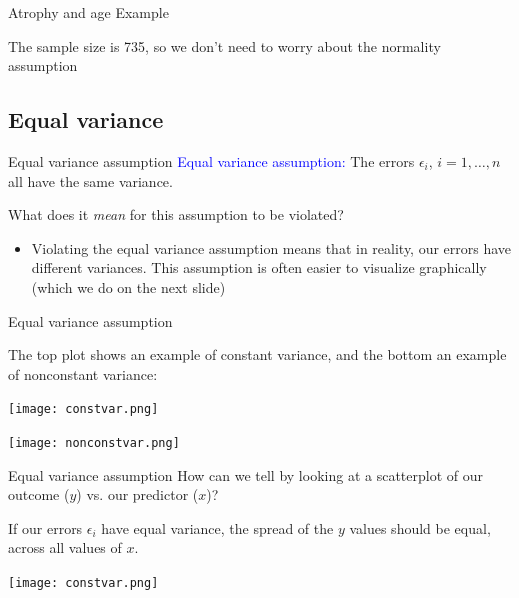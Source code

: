 \documentclass[10pt,t]{beamer}
\begin{document}
\begin{frame}{Atrophy and age Example}

The sample size is 735, so we don't need to worry about the normality assumption

\end{frame}

\subsection{Equal variance}

\begin{frame}{Equal variance assumption}
\textcolor{blue}{Equal variance assumption:} The errors $\epsilon_i$, $i = 1, \dots, n$ all have the same variance.

\vspace{0.3cm}

What does it \textit{mean} for this assumption to be violated?

\begin{itemize}
	\item[] Violating the equal variance assumption means that in reality, our errors have different variances. This assumption is often easier to visualize graphically (which we do on the next slide)
\end{itemize}

\end{frame}

\begin{frame}{Equal variance assumption}

The top plot shows an example of constant variance, and the bottom an example of nonconstant variance:

\vspace{0.3cm}

\centering

\texttt{[image: constvar.png]}

\texttt{[image: nonconstvar.png]}

\end{frame}

\begin{frame}{Equal variance assumption}
How can we tell by looking at a scatterplot of our outcome ($y$) vs. our predictor ($x$)?

\vspace{0.3cm}

If our errors $\epsilon_i$ have equal variance, the spread of the $y$ values should be equal, across all values of $x$.

\vspace{0.3cm}
\centering

\texttt{[image: constvar.png]}

\end{frame}
\end{document}
